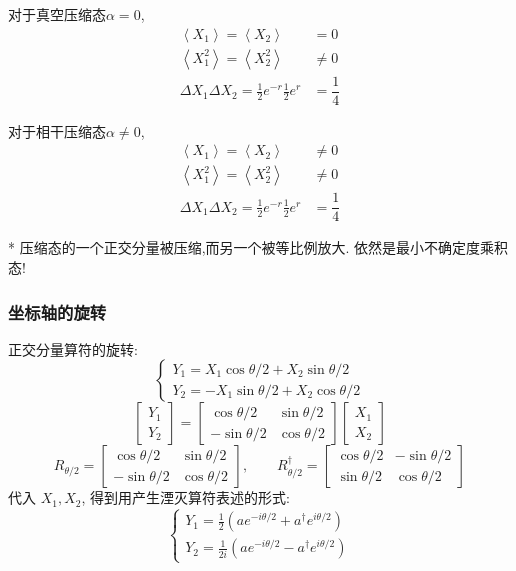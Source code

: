 \begin{frame}
      \frametitle{}
  对于真空压缩态$\alpha=0$, 
  \[\begin{aligned}
    \left\langle X_1 \right\rangle=\left\langle X_2 \right\rangle &= 0 \\ 
    \left\langle X_1 ^2 \right\rangle=\left\langle X_2 ^2 \right\rangle & \not = 0 \\ 
    \Delta X_1 \Delta X_2 = \frac{1}{2} e^{-r} \frac{1}{2} e^{r} &= \dfrac{1}{4}
\end{aligned} \]  

对于相干压缩态$\alpha \not = 0$, 
\[\begin{aligned}
  \left\langle X_1 \right\rangle=\left\langle X_2 \right\rangle & \not = 0 \\ 
  \left\langle X_1 ^2 \right\rangle=\left\langle X_2 ^2 \right\rangle & \not = 0 \\ 
  \Delta X_1 \Delta X_2 = \frac{1}{2} e^{-r} \frac{1}{2} e^{r} &= \dfrac{1}{4}
\end{aligned} \] 

* 压缩态的一个正交分量被压缩,而另一个被等比例放大. 依然是最小不确定度乘积态!
\end{frame}


\begin{frame}  
    \frametitle{坐标轴的旋转}
    正交分量算符的旋转:    
    $$\left\{\begin{matrix}
        Y_1=X_1\cos\theta /2 +X_2\sin\theta /2\\
        Y_2=-X_1\sin\theta /2 +X_2\cos\theta /2
    \end{matrix}\right.$$
    $$\begin{bmatrix}
        Y_1 \\
        Y_2
    \end{bmatrix}
    =
    \begin{bmatrix}
        \cos\theta /2 & \sin\theta /2\\
        -\sin\theta /2 & \cos\theta /2
    \end{bmatrix}
    \begin{bmatrix}
        X_1 \\
        X_2
    \end{bmatrix}$$
    $$ R_{\theta /2}=
    \begin{bmatrix}
        \cos\theta  /2 &\sin\theta /2\\
        -\sin\theta /2 &\cos\theta /2
    \end{bmatrix} ,\qquad
    R_{\theta  /2} ^{\dagger}=
    \begin{bmatrix}
        \cos\theta /2 & -\sin\theta /2\\
        \sin\theta /2 &\cos\theta /2
    \end{bmatrix} $$
    代入 $X_1, X_2$, 得到用产生湮灭算符表述的形式: 
    $$\left\{\begin{matrix}
        Y_1=\frac{1}{2}(a e^{-i \theta /2 }+a^\dagger e^{i \theta /2 })\\
        Y_2=\frac{1}{2i}(a e^{-i \theta /2 }-a^\dagger e^{i \theta /2 })
    \end{matrix}\right.$$
   \[ \]
\end{frame}

